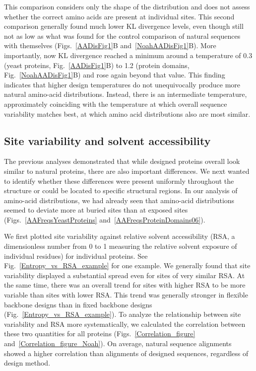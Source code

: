 \documentclass[12pt]{article}
\begin{document}
This comparison considers only the shape of the distribution and does not assess whether the correct amino acids are present at individual sites. This second comparison generally found much lower KL divergence levels, even though still not as low as what was found for the control comparison of natural sequences with themselves (Figs.~\ref{AADisFig1}B and~\ref{NoahAADisFig1}B). More importantly, now KL divergence reached a minimum around a temperature of 0.3 (yeast proteins, Fig.~\ref{AADisFig1}B) to 1.2 (protein domains, Fig.~\ref{NoahAADisFig1}B) and rose again beyond that value. This finding indicates that higher design temperatures do not unequivocally produce more natural amino-acid distributions. Instead, there is an intermediate temperature, approximately coinciding with the temperature at which overall sequence variability matches best, at which amino acid distributions also are most similar.

\subsection{Site variability and solvent accessibility}
\label{ProteinStructure}

The previous analyses demonstrated that while designed proteins overall look similar to natural proteins, there are also important differences. We next wanted to identify whether these differences were present uniformly throughout the structure or could be located to specific structural regions. In our analysis of amino-acid distributions, we had already seen that amino-acid distributions seemed to deviate more at buried sites than at exposed sites (Figs.~\ref{AAFreqsYeastProteins} and~\ref{AAFreqsProteinDomains06}).

We first plotted site variability against relative solvent accessibility (RSA, a dimensionless number from 0 to 1 measuring the relative solvent exposure of individual residues) for individual proteins. See Fig.~\ref{Entropy_vs_RSA_example} for one example. We generally found that site variability displayed a substantial spread even for sites of very similar RSA. At the same time, there was an overall trend for sites with higher RSA to be more variable than sites with lower RSA. This trend was generally stronger in flexible backbone designs than in fixed backbone designs (Fig.~\ref{Entropy_vs_RSA_example}). To analyze the relationship between site variability and RSA more systematically, we calculated the correlation between these two quantities for all proteins (Figs.~\ref{Correlation_figure} and~\ref{Correlation_figure_Noah}). On average, natural sequence alignments showed a higher correlation than alignments of designed sequences, regardless of design method. 
\end{document}
